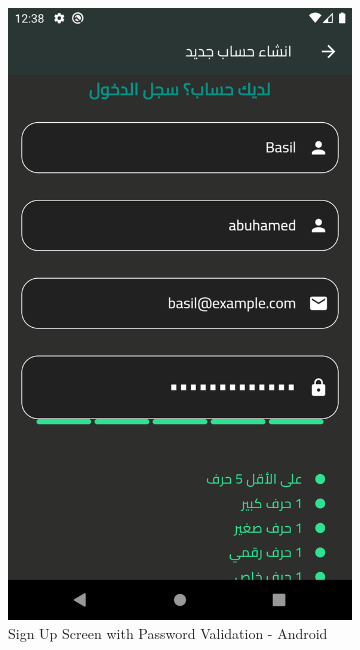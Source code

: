 \documentclass[a4paper, 12pt]{report} %
\begin{document}
\begin{figure}[H]
\begin{subfigure}{0.3\textwidth}
                    \includegraphics[width=0.8\linewidth, height=0.9\textheight, keepaspectratio]{Images/user_sign_up_2.png}  
                    \caption{Sign Up Screen with Password Validation - Android}
                    \label{fig:real_sign_up_2}
                \end{subfigure}
                \begin{subfigure}{0.3\textwidth}

\end{subfigure}
\end{figure}
\end{document}
